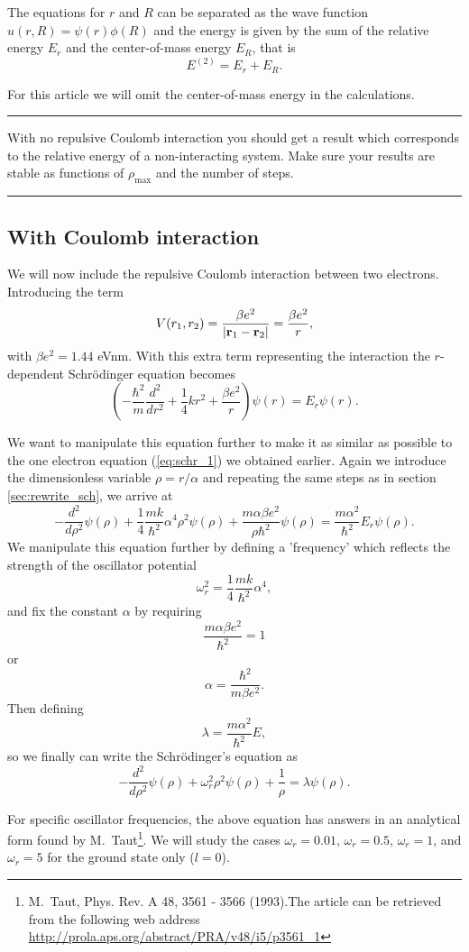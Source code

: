 \documentclass[11pt,a4wide]{article}
\begin{document}
The equations for $r$ and $R$ can be separated as the wave function $u(r,R) = \psi(r)\phi(R)$ and the energy is given by the sum of the relative energy $E_r$ and the center-of-mass energy $E_R$, that is
\[
E^{(2)}=E_r+E_R.
\]

For this article we will omit the center-of-mass energy in the calculations.

\noindent\rule{\textwidth}{1pt}
With no repulsive Coulomb interaction 
you should get a result which corresponds to 
the relative energy of a non-interacting system.   
Make sure your results are 
stable as functions of $\rho_{\mathrm{max}}$ and the number of steps.
\noindent\rule{\textwidth}{1pt}

\subsection{With Coulomb interaction}
We will now include the repulsive Coulomb interaction between two electrons. Introducing the term
\[
V(r_1,r_2) = \frac{\beta e^2}{|{\bf r}_1-{\bf r}_2|}=\frac{\beta e^2}{r},
\]
with $\beta e^2=1.44$ eVnm. With this extra term representing the interaction the $r$-dependent Schr\"odinger equation becomes
\[
\left(  -\frac{\hbar^2}{m} \frac{d^2}{dr^2}+ \frac{1}{4}k r^2+\frac{\beta e^2}{r}\right)\psi(r)  = E_r \psi(r).
\]

We want to manipulate this equation further to make it as similar as possible to the one electron equation (\ref{eq:schr_1}) we obtained earlier. Again we introduce the dimensionless variable $\rho = r/\alpha$ and repeating the same steps as in section \ref{sec:rewrite_sch}, we arrive at 
\[
  -\frac{d^2}{d\rho^2} \psi(\rho) 
       + \frac{1}{4}\frac{mk}{\hbar^2} \alpha^4\rho^2\psi(\rho)+\frac{m\alpha \beta e^2}{\rho\hbar^2}\psi(\rho)  = 
\frac{m\alpha^2}{\hbar^2}E_r \psi(\rho) .
\]
We manipulate this equation further by defining a 'frequency' which reflects the strength of the oscillator potential
\[
\omega_r^2=\frac{1}{4}\frac{mk}{\hbar^2} \alpha^4,
\]
and fix the constant $\alpha$ by requiring 
\[
\frac{m\alpha \beta e^2}{\hbar^2}=1
\]
or 
\[
\alpha = \frac{\hbar^2}{m\beta e^2}.
\]
Then defining 
\[
\lambda = \frac{m\alpha^2}{\hbar^2}E,
\]
so we finally can write the Schr\"odinger's equation as
\begin{equation}
  -\frac{d^2}{d\rho^2} \psi(\rho) + \omega_r^2\rho^2\psi(\rho) +\frac{1}{\rho} = \lambda \psi(\rho).
  \label{eq: sch_2e_wCol}
\end{equation}

For specific oscillator frequencies, the above equation has answers in an analytical form found by M.~Taut\footnote{M.~Taut, Phys. Rev. A 48, 3561 - 3566 (1993).The article can be retrieved from the following web address \url{http://prola.aps.org/abstract/PRA/v48/i5/p3561_1}}. We will study the cases $\omega_r = 0.01$, $\omega_r = 0.5$, $\omega_r =1$, and $\omega_r = 5$ for the ground state only ($l=0$).
\end{document}
